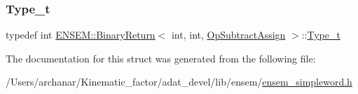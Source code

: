 \mbox{\label{structENSEM_1_1BinaryReturn_3_01int_00_01int_00_01OpSubtractAssign_01_4_a5c5a1e9edfbb3a04f0197f2657b88279}} 
\subsubsection{\texorpdfstring{Type\_t}{Type\_t}\hspace{0.1cm}{\footnotesize\ttfamily [2/2]}}
{\footnotesize\ttfamily typedef int \mbox{\hyperlink{structENSEM_1_1BinaryReturn}{E\+N\+S\+E\+M\+::\+Binary\+Return}}$<$ int, int, \mbox{\hyperlink{structENSEM_1_1OpSubtractAssign}{Op\+Subtract\+Assign}} $>$\+::\mbox{\hyperlink{structENSEM_1_1BinaryReturn_3_01int_00_01int_00_01OpSubtractAssign_01_4_a5c5a1e9edfbb3a04f0197f2657b88279}{Type\+\_\+t}}}



The documentation for this struct was generated from the following file\+:\begin{DoxyCompactItemize}
\item 
/\+Users/archanar/\+Kinematic\+\_\+factor/adat\+\_\+devel/lib/ensem/\mbox{\hyperlink{lib_2ensem_2ensem__simpleword_8h}{ensem\+\_\+simpleword.\+h}}\end{DoxyCompactItemize}
